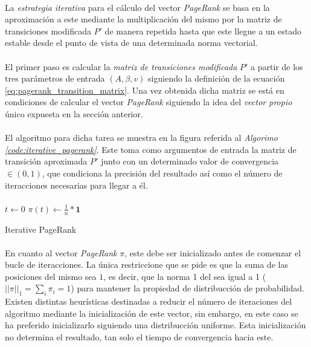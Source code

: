 \documentclass{subfiles}
\begin{document}
        \paragraph{}
        La \emph{estrategia iterativa} para el cálculo del vector \emph{PageRank} se basa en la aproximación a este mediante la multiplicación del mismo por la matriz de transiciones modificada $P'$ de manera repetida hasta que este llegue a un estado estable desde el punto de vista de una determinada norma vectorial.

        \paragraph{}
        El primer paso es calcular la \emph{matriz de transiciones modificada} $P'$ a partir de los tres parámetros de entrada $(A, \beta, v)$  siguiendo la definición de la ecuación \eqref{eq:pagerank_transition_matrix}. Una vez obtenida dicha matriz se está en condiciones de calcular el vector \emph{PageRank} siguiendo la idea del \emph{vector propio} único expuesta en la sección anterior.

        \paragraph{}
        El algoritmo para dicha tarea se muestra en la figura referida al \emph{Algorimo \ref{code:iterative_pagerank}}. Este toma como argumentos de entrada la matriz de transición aproximada $P'$ junto con un determinado valor de convergencia $\in (0,1)$, que condiciona la precisión del resultado así como el número de iteracciones necesarias para llegar a él.

        \paragraph{}
        \begin{algorithm}
          \SetAlgoLined
          $t \gets 0$\;
          $\pi(t) \gets \frac{1}{n}*\boldsymbol{1}$\;
          \caption{Iterative PageRank}
          \label{code:iterative_pagerank}
        \end{algorithm}

        \paragraph{}
        En cuanto al vector \emph{PageRank} $\pi$, este debe ser inicializado antes de comenzar el bucle de iteracciones. La única restriccione que se pide es que la suma de las posiciones del mismo sea $1$, es decir, que la norma 1 del sea igual a 1 ($||\pi||_1 = \sum_i \pi_i = 1$) para mantener la propiedad de distribucción de probabilidad. Existen distintas heurísticas destinadas a reducir el número de iteraciones del algoritmo mediante la inicialización de este vector, sin embargo, en este caso se ha preferido inicializarlo siguiendo una distribucción uniforme. Esta inicialización no determina el resultado, tan solo el tiempo de convergencia hacia este.
\end{document}
